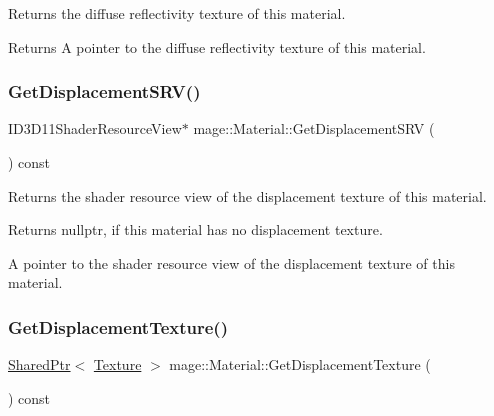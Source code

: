 Returns the diffuse reflectivity texture of this material.

\begin{DoxyReturn}{Returns}
A pointer to the diffuse reflectivity texture of this material. 
\end{DoxyReturn}
\hypertarget{structmage_1_1_material_a638ee0913aa0722f499c883b71549503}{}\label{structmage_1_1_material_a638ee0913aa0722f499c883b71549503} 
\subsubsection{\texorpdfstring{Get\+Displacement\+S\+R\+V()}{GetDisplacementSRV()}}
{\footnotesize\ttfamily I\+D3\+D11\+Shader\+Resource\+View$\ast$ mage\+::\+Material\+::\+Get\+Displacement\+S\+RV (\begin{DoxyParamCaption}{ }\end{DoxyParamCaption}) const\hspace{0.3cm}{\ttfamily [noexcept]}}

Returns the shader resource view of the displacement texture of this material.

\begin{DoxyReturn}{Returns}
{\ttfamily nullptr}, if this material has no displacement texture. 

A pointer to the shader resource view of the displacement texture of this material. 
\end{DoxyReturn}
\hypertarget{structmage_1_1_material_ab548fbf5844ae7cd2822304ef7fb9602}{}\label{structmage_1_1_material_ab548fbf5844ae7cd2822304ef7fb9602} 
\subsubsection{\texorpdfstring{Get\+Displacement\+Texture()}{GetDisplacementTexture()}}
{\footnotesize\ttfamily \hyperlink{namespacemage_a1e01ae66713838a7a67d30e44c67703e}{Shared\+Ptr}$<$ \hyperlink{classmage_1_1_texture}{Texture} $>$ mage\+::\+Material\+::\+Get\+Displacement\+Texture (\begin{DoxyParamCaption}{ }\end{DoxyParamCaption}) const\hspace{0.3cm}{\ttfamily [noexcept]}}

